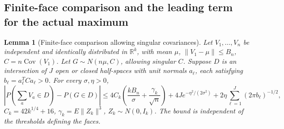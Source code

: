 \documentclass[a4paper,11pt]{article}
\newtheorem{lemma}{Lemma}[section]
\theoremstyle{remark}
\begin{document}
\subsection{Finite-face comparison and the leading term for the actual maximum}
\begin{lemma}[Finite-face comparison allowing singular covariances]\label{lem:paperpolyface}
Let $V_1,\ldots,V_n$ be independent and identically distributed in $\mathbb R^k$, with mean $\mu$,
$\|V_1-\mu\|\le B_n$, $C=n\operatorname{Cov}(V_1)$.
Let $G\sim N(n\mu,C)$, allowing singular $C$. Suppose $D$ is an intersection of $J$ open or closed half-spaces
with unit normals $a_\ell$, each satisfying $b_\ell=a_\ell^TCa_\ell>0$.
For every $\sigma,\eta>0$,
\[
 |P(\sum_aV_a\in D)-P(G\in D)|
 \le4C_k\left(\frac{kB_n}{\sigma}+\frac{\gamma_k}{\sqrt n}\right)
 +4Je^{-\eta^2/(2\sigma^2)}
 +2\eta\sum_{\ell=1}^J(2\pi b_\ell)^{-1/2},
\]
$C_k=42k^{1/4}+16$, $\gamma_k=E\|Z_k\|^3$, $Z_k\sim N(0,I_k)$.
The bound is independent of the thresholds defining the faces.
\end{lemma}
\end{document}
